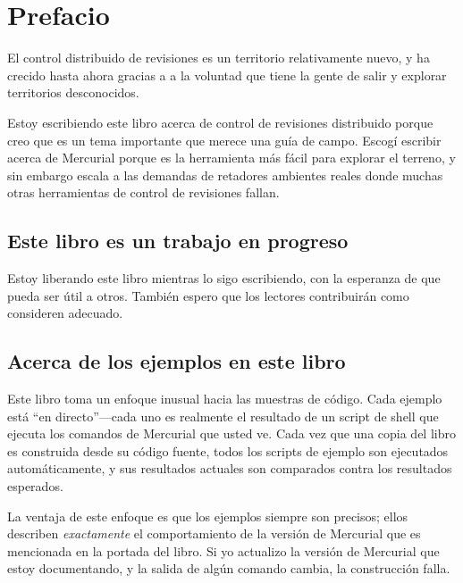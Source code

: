 \chapter*{Prefacio}
\label{chap:preface}

El control distribuido de revisiones es un territorio relativamente 
nuevo, y ha crecido hasta ahora 
gracias a  a la voluntad que tiene la gente de salir y explorar
territorios desconocidos.

Estoy escribiendo este libro acerca de control de revisiones
distribuido porque creo que es un tema importante que merece una guía
de campo. Escogí escribir acerca de Mercurial porque es la herramienta
más fácil para explorar el terreno, y sin embargo escala a las
demandas de retadores ambientes reales donde muchas otras herramientas
de control de revisiones fallan.

\section{Este libro es un trabajo en progreso}
Estoy liberando este libro mientras lo sigo escribiendo, con la
esperanza de que pueda ser útil a otros. También espero que los
lectores contribuirán como consideren adecuado.

\section{Acerca de los ejemplos en este libro}
Este libro toma un enfoque inusual hacia las muestras de código. Cada
ejemplo está ``en directo''---cada uno es realmente el resultado de un
script de shell que ejecuta los comandos de Mercurial que usted ve.
Cada vez que una copia del libro es construida desde su código fuente,
todos los scripts de ejemplo son ejecutados automáticamente, y sus
resultados actuales son comparados contra los resultados esperados.

La ventaja de este enfoque es que los ejemplos siempre son precisos;
ellos describen \emph{exactamente} el comportamiento de la versión de
Mercurial que es mencionada en la portada del libro. Si yo actualizo
la versión de Mercurial que estoy documentando, y la salida de algún
comando cambia, la construcción falla.

